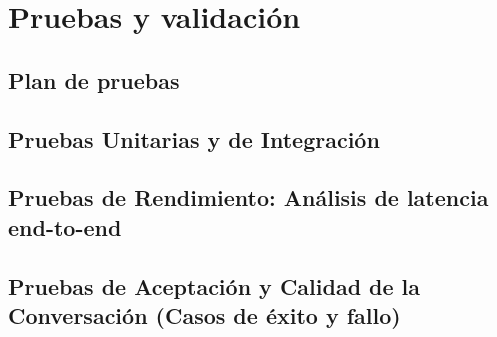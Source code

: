 \chapter{\textbf{Pruebas y validación}}
\label{ch:Pruebas}
\thispagestyle{fancy}

\section{Plan de pruebas}
\label{sec:plan_pruebas}

\textoBase

\section{Pruebas Unitarias y de Integración}
\label{sec:pruebas_unitarias_integracion}

\textoBaseAlt

\section{Pruebas de Rendimiento: Análisis de latencia end-to-end}
\label{sec:pruebas_rendimiento}

\textoBase


\section{Pruebas de Aceptación y Calidad de la Conversación (Casos de éxito y fallo)}
\label{sec:pruebas_aceptacion}

\textoBaseAlt
